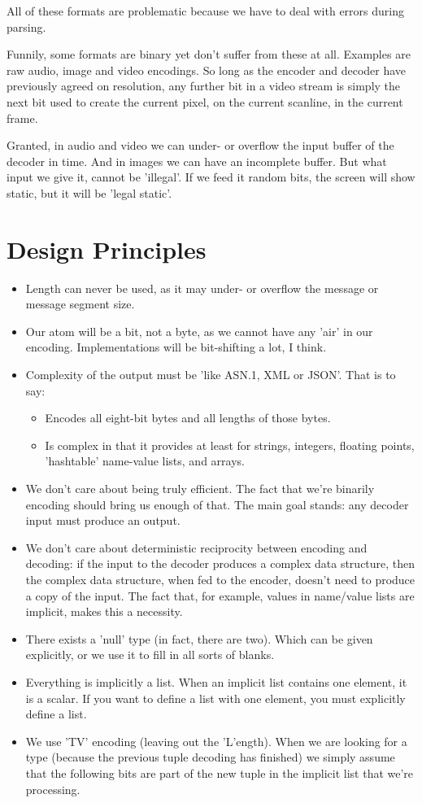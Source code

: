 All of these formats are problematic because we have to deal with
errors during parsing.

Funnily, some formats are binary yet don't suffer from these at all.
Examples are raw audio, image and video encodings. So long as the
encoder and decoder have previously agreed on resolution,
any further bit in a video stream is simply the next bit used to
create the current pixel, on the current scanline, in the current frame.

Granted, in audio and video we can under- or overflow the input buffer of the
decoder in time. And in images we can have an incomplete buffer.
But what input we give it, cannot be 'illegal'. If we feed
it random bits, the screen will show static, but it will be 'legal static'.

\section{Design Principles}
 
\begin{itemize}
\item Length can never be used, as it may under- or overflow the message
  or message segment size.
\item Our atom will be a bit, not a byte, as we cannot have any 'air'
  in our encoding. Implementations will be bit-shifting a lot, I think.
\item Complexity of the output must be 'like ASN.1, XML or JSON'.
  That is to say:
  \begin{itemize}
  \item Encodes all eight-bit bytes and all lengths of those bytes.
  \item Is complex in that it provides at least for strings, integers,
    floating points, 'hashtable' name-value lists, and arrays.
  \end{itemize}
\item We don't care about being truly efficient. The fact that we're
  binarily encoding should bring us enough of that. The main goal stands:
  any decoder input must produce an output.
\item We don't care about deterministic reciprocity between encoding
  and decoding: if the input to the decoder produces
  a complex data structure, then the complex data structure, when fed
  to the encoder, doesn't need to produce a copy of the input.
  The fact that, for example, values in name/value lists are implicit,
  makes this a necessity.
\item There exists a 'null' type (in fact, there are two).
  Which can be given explicitly, or
  we use it to fill in all sorts of blanks.
\item Everything is implicitly a list. When an implicit list contains
  one element, it is a scalar. If you want to define a list with
  one element, you must explicitly define a list.
\item We use 'TV' encoding (leaving out the 'L'ength).
  When we are looking for a type (because the previous tuple decoding
  has finished) we simply assume that the following bits are part of the
  new tuple in the implicit list that we're processing.
\end{itemize}

